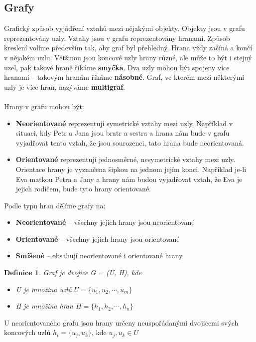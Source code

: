 \documentclass[10pt,a4paper]{article}
\newtheorem{definition}{Definice}
\begin{document}
\subsection{Grafy}
Grafický způsob vyjádření vztahů mezi nějakými objekty. Objekty jsou v grafu reprezentovány uzly. Vztahy jsou v grafu reprezentovány hranami. Způsob kreslení volíme především tak, aby graf byl přehledný. Hrana vždy začíná a končí v nějakém uzlu. Většinou jsou koncové uzly hrany různé, ale může to být i stejný uzel, pak takové hraně říkáme \textbf{smyčka}. Dva uzly mohou být spojeny více hranami – takovým hranám říkáme \textbf{násobné}. Graf, ve kterém mezi některými uzly je více hran, nazýváme \textbf{multigraf}.
\\ \\
Hrany v grafu mohou být:
\begin{itemize}
	\item \textbf{Neorientované} reprezentují symetrické vztahy mezi uzly. Například v situaci, kdy Petr a Jana jsou bratr a sestra a hrana nám bude v grafu vyjadřovat tento vztah, že jsou sourozenci, tato hrana bude neorientovaná.
	\item \textbf{Orientované} reprezentují jednosměrné, nesymetrické vztahy mezi uzly. Orientace hrany je vyznačena šipkou na jednom jejím konci. Například je-li Eva matkou Petra a Jany a hrany nám budou vyjadřovat vztah, že Eva je jejich rodičem, bude tyto hrany orientované.
\end{itemize}
Podle typu hran dělíme grafy na:
\begin{itemize}
	\item \textbf{Neorientované} – všechny jejich hrany jsou neorientované
	\item \textbf{Orientované} – všechny jejich hrany jsou orientované
	\item \textbf{Smíšené} – obsahují neorientované i orientované hrany
\end{itemize}
\begin{definition}
Graf je dvojice G = (U, H), kde \\
\begin{itemize}
	\item[] U je množina uzlů $U = \{ u_1, u_2, \cdots, u_m \}$\\
	\item[] H je množina hran $H = \{ h_1, h_2, \cdots, h_n \}$
\end{itemize}
\end{definition}
U neorientovaného grafu jsou hrany určeny neuspořádanými dvojicemi svých koncových uzlů $h_i = \{ u_j, u_k\}$, kde $u_j, u_k \in U$ \\
\end{document}
